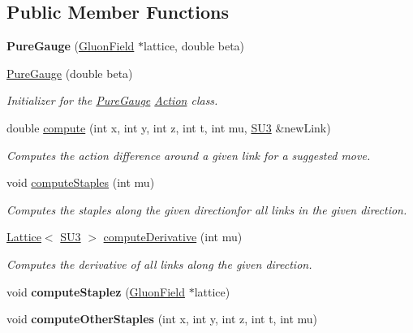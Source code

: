 \subsection*{Public Member Functions}
\begin{DoxyCompactItemize}
\item 
{\bfseries Pure\+Gauge} (\hyperlink{field_8h_afe80b127697eba6d6e7fbd8121c8d4ee}{Gluon\+Field} $\ast$lattice, double beta)\hypertarget{classPureGauge_ae832fd1e6b53f6ca3d22961f4a2f80f7}{}\label{classPureGauge_ae832fd1e6b53f6ca3d22961f4a2f80f7}

\item 
\hyperlink{classPureGauge_ab219e717e036ee44696ba360a2b3674b}{Pure\+Gauge} (double beta)
\begin{DoxyCompactList}\small\item\em Initializer for the \hyperlink{classPureGauge}{Pure\+Gauge} \hyperlink{classAction}{Action} class. \end{DoxyCompactList}\item 
double \hyperlink{classPureGauge_a17facfc54c75a588826c00f8ef185bf0}{compute} (int x, int y, int z, int t, int mu, \hyperlink{structSU3}{S\+U3} \&new\+Link)\hypertarget{classPureGauge_a17facfc54c75a588826c00f8ef185bf0}{}\label{classPureGauge_a17facfc54c75a588826c00f8ef185bf0}

\begin{DoxyCompactList}\small\item\em Computes the action difference around a given link for a suggested move. \end{DoxyCompactList}\item 
void \hyperlink{classPureGauge_a7c78eb206450a209b4154fc936d8aad1}{compute\+Staples} (int mu)
\begin{DoxyCompactList}\small\item\em Computes the staples along the given directionfor all links in the given direction. \end{DoxyCompactList}\item 
\hyperlink{classLattice}{Lattice}$<$ \hyperlink{structSU3}{S\+U3} $>$ \hyperlink{classPureGauge_a0d9272be98cf62567bbda93a892718eb}{compute\+Derivative} (int mu)
\begin{DoxyCompactList}\small\item\em Computes the derivative of all links along the given direction. \end{DoxyCompactList}\item 
void {\bfseries compute\+Staplez} (\hyperlink{field_8h_afe80b127697eba6d6e7fbd8121c8d4ee}{Gluon\+Field} $\ast$lattice)\hypertarget{classPureGauge_a28706ff95422d3ac6e1dc9d2aabccf1a}{}\label{classPureGauge_a28706ff95422d3ac6e1dc9d2aabccf1a}

\item 
void {\bfseries compute\+Other\+Staples} (int x, int y, int z, int t, int mu)\hypertarget{classPureGauge_a5722f484c169539471da120aefa97dea}{}\label{classPureGauge_a5722f484c169539471da120aefa97dea}

\end{DoxyCompactItemize}
